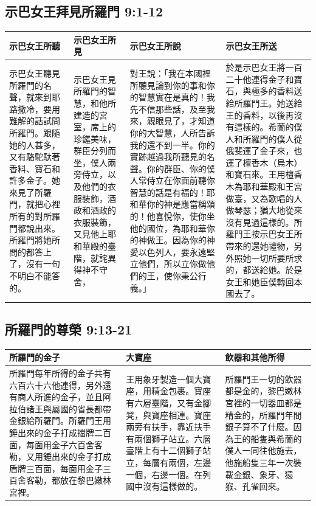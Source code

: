\subsection{示巴女王拜見所羅門 9:1-12 }
\begin{table}[H]
\centering 
\begin{tabular}{p{3.25cm}|p{2.65cm}|p{5.35cm}||p{5.25cm}}\hline\hline
示巴女王所聽&示巴女王所見&示巴女王所說&示巴女王所送\\\hline\hline
示巴女王聽見所羅門的名聲，就來到耶路撒冷，要用難解的話試問所羅門。跟隨她的人甚多，又有駱駝馱著香料、寶石和許多金子。她來見了所羅門，就把心裡所有的對所羅門都說出來。所羅門將她所問的都答上了，沒有一句不明白不能答的。
&示巴女王見所羅門的智慧，和他所建造的宮室，席上的珍饈美味，群臣分列而坐，僕人兩旁侍立，以及他們的衣服裝飾，酒政和酒政的衣服裝飾，又見他上耶和華殿的臺階，就詫異得神不守舍，
&對王說：「我在本國裡所聽見論到你的事和你的智慧實在是真的！我先不信那些話，及至我來，親眼見了，才知道你的大智慧，人所告訴我的還不到一半。你的實跡越過我所聽見的名聲。你的群臣、你的僕人常侍立在你面前聽你智慧的話是有福的！耶和華你的神是應當稱頌的！他喜悅你，使你坐他的國位，為耶和華你的神做王。因為你的神愛以色列人，要永遠堅立他們，所以立你做他們的王，使你秉公行義。」
&於是示巴女王將一百二十他連得金子和寶石，與極多的香料送給所羅門王。她送給王的香料，以後再沒有這樣的。希蘭的僕人和所羅門的僕人從俄斐運了金子來，也運了檀香木（烏木）和寶石來。王用檀香木為耶和華殿和王宮做臺，又為歌唱的人做琴瑟；猶大地從來沒有見過這樣的。所羅門王按示巴女王所帶來的還她禮物，另外照她一切所要所求的，都送給她。於是女王和她臣僕轉回本國去了。\\\hline
\end{tabular}
\end{table}



\subsection{所羅門的尊榮 9:13-21}
\begin{table}[H]
\centering 
\begin{tabular}{p{6.25cm}|p{5.25cm}|p{4.75cm}}\hline\hline
所羅門的金子&大寶座&飲器和其他所得\\\hline\hline
所羅門每年所得的金子共有六百六十六他連得，另外還有商人所進的金子，並且阿拉伯諸王與屬國的省長都帶金銀給所羅門。所羅門王用錘出來的金子打成擋牌二百面，每面用金子六百舍客勒，又用錘出來的金子打成盾牌三百面，每面用金子三百舍客勒，都放在黎巴嫩林宮裡。
&王用象牙製造一個大寶座，用精金包裹。寶座有六層臺階，又有金腳凳，與寶座相連。寶座兩旁有扶手，靠近扶手有兩個獅子站立。六層臺階上有十二個獅子站立，每層有兩個，左邊一個，右邊一個。在列國中沒有這樣做的。
&所羅門王一切的飲器都是金的，黎巴嫩林宮裡的一切器皿都是精金的，所羅門年間銀子算不了什麼。因為王的船隻與希蘭的僕人一同往他施去，他施船隻三年一次裝載金銀、象牙、猿猴、孔雀回來。\\\hline
\end{tabular}
\end{table}
 

